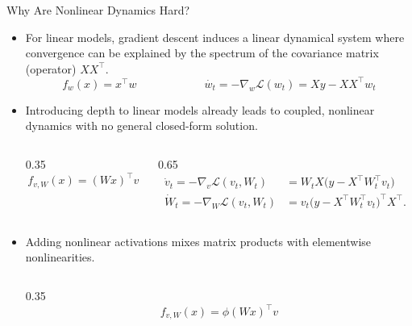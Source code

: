 \documentclass[10pt,aspectratio=169]{beamer}
\begin{document}
\begin{frame}[t]{Why Are Nonlinear Dynamics Hard?}

	\begin{itemize}
		\item For linear models, gradient descent induces a linear dynamical system where convergence can
		      be explained by the spectrum of the covariance matrix (operator) $XX^\top$.
			      {\footnotesize
				      \[
					      f_w(x) = x^\top w \qquad \qquad \qquad \dot{w_t} = -\nabla_w\mathcal{L}(w_t) = Xy - XX^\top w_t
				      \]
			      }
		      \vspace{-2em}
		      \pause
		\item Introducing depth to linear models already leads to coupled, nonlinear dynamics with no general closed-form solution.
		      \begin{columns}[T,onlytextwidth]
			      \begin{column}{0.35\textwidth}
				      \centering
				      {\footnotesize
					      \[
						      f_{v,W}(x) = (Wx)^\top v
					      \]
				      }
			      \end{column}
			      \begin{column}{0.65\textwidth}
				      {\footnotesize
					      \[
						      \begin{aligned}
							      \dot v_t = -\nabla_v \mathcal{L}(v_t,W_t)
							       & = W_t X \bigl(y - X^\top W_t^\top v_t\bigr)             \\
							      \dot W_t = -\nabla_W \mathcal{L}(v_t,W_t)
							       & = v_t \bigl(y - X^\top W_t^\top v_t\bigr)^\top X^\top .
						      \end{aligned}
					      \]
				      }
			      \end{column}
		      \end{columns}
		      \pause
		\item Adding nonlinear activations mixes matrix products with elementwise nonlinearities.
		      \begin{columns}[T,onlytextwidth]
			      \begin{column}{0.35\textwidth}
				      \centering
				      {\footnotesize
					      \[
						      f_{v,W}(x) = \phi(Wx)^\top v
					      \]
				      }

\end{column}
\end{columns}
\end{itemize}
\end{frame}
\end{document}
